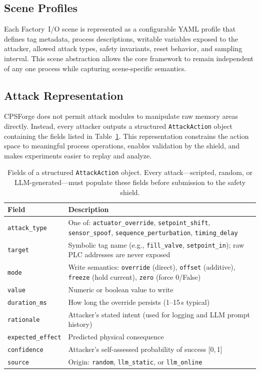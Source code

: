 \subsection{Scene Profiles}

Each Factory~I/O scene is represented as a configurable YAML profile that defines tag metadata, process descriptions, writable variables exposed to the attacker, allowed attack types, safety invariants, reset behavior, and sampling interval. This scene abstraction allows the core framework to remain independent of any one process while capturing scene-specific semantics.

\subsection{Attack Representation}
\label{sec:impl:attack}

CPSForge does not permit attack modules to manipulate raw memory areas directly. Instead, every attacker outputs a structured \texttt{AttackAction} object containing the fields listed in Table~\ref{tab:action-fields}. This representation constrains the action space to meaningful process operations, enables validation by the shield, and makes experiments easier to replay and analyze.

\begin{table}[t]
\centering
\caption{Fields of a structured \texttt{AttackAction} object. Every attack---scripted, random, or LLM-generated---must populate these fields before submission to the safety shield.}
\label{tab:action-fields}
\small
\begin{tabular}{lp{5.2cm}}
\toprule
\textbf{Field} & \textbf{Description} \\
\midrule
\texttt{attack\_type} & One of: \texttt{actuator\_override}, \texttt{setpoint\_shift}, \texttt{sensor\_spoof}, \texttt{sequence\_perturbation}, \texttt{timing\_delay} \\
\texttt{target} & Symbolic tag name (e.g., \texttt{fill\_valve}, \texttt{setpoint\_in}); raw PLC addresses are never exposed \\
\texttt{mode} & Write semantics: \texttt{override} (direct), \texttt{offset} (additive), \texttt{freeze} (hold current), \texttt{zero} (force 0/False) \\
\texttt{value} & Numeric or boolean value to write \\
\texttt{duration\_ms} & How long the override persists (1--15\,s typical) \\
\texttt{rationale} & Attacker's stated intent (used for logging and LLM prompt history) \\
\texttt{expected\_effect} & Predicted physical consequence \\
\texttt{confidence} & Attacker's self-assessed probability of success [0,\,1] \\
\texttt{source} & Origin: \texttt{random}, \texttt{llm\_static}, or \texttt{llm\_online} \\
\bottomrule
\end{tabular}
\end{table}


